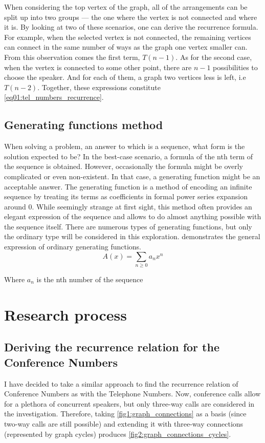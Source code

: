 \documentclass[stu, 11pt, a4paper, floatsintext]{apa7}
\begin{document}
	When considering the top vertex of the graph, all of the arrangements can be split up into two groups — the one where the vertex is not connected and where it is. By looking at two of these scenarios, one can derive the recurrence formula. For example, when the selected vertex is not connected, the remaining vertices can connect in the same number of ways as the graph one vertex smaller can. From this observation comes the first term, $T(n-1)$. As for the second case, when the vertex is connected to some other point, there are $n-1$ possibilities to choose the speaker. And for each of them, a graph two vertices less is left, i.e $T(n-2)$. Together, these expressions constitute \cref{eq01:tel_numbers_recurrence}.
	\subsection{Generating functions method}
	When solving a problem, an answer to which is a sequence, what form is the solution expected to be? In the best-case scenario, a formula of the nth term of the sequence is obtained. However, occasionally the formula might be overly complicated or even non-existent. In that case, a generating function might be an acceptable answer. The generating function is a method of encoding an infinite sequence by treating its terms as coefficients in formal power series expansion around 0. While seemingly strange at first sight, this method often provides an elegant expression of the sequence and allows to do almost anything possible with the sequence itself. There are numerous types of generating functions, but only the ordinary type will be considered in this exploration.  demonstrates the general expression of ordinary generating functions.
	\begin{equation}
		\label{eq02:regular_generating_func_expr}
		A(x)=\sum_{n\geq 0}a_nx^n
	\end{equation}
	\begin{center}
		Where $a_n$ is the nth number of the sequence
	\end{center}
	\section{Research process}
	\subsection{Deriving the recurrence relation for the Conference Numbers}
	I have decided to take a similar approach to find the recurrence relation of Conference Numbers as with the Telephone Numbers. Now, conference calls allow for a plethora of concurrent speakers, but only three-way calls are considered in the investigation. Therefore, taking \cref{fig1:graph_connections} as a basis (since two-way calls are still possible) and extending it with three-way connections (represented by graph cycles) produces \cref{fig2:graph_connections_cycles}.
	
\end{document}
